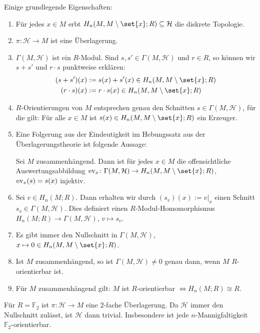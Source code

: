 \begin{bemerkung}[{name=[{Eigenschaften der Vereinigung der Homologieklassen}]},label=bem:1612]
	Einige grundlegende Eigenschaften:
	\begin{enumerate}[1),itemsep=1pt]
		\item Für jedes $x \in M$ erbt $H_n(M,M \setminus \set{x};R) \subseteq \mathcal{H}$ die diskrete Topologie.
		\item $\pi \colon \mathcal{H} \to M$ ist eine Überlagerung.
		\item $\Gamma(M,\mathcal{H})$ ist ein $R$-Modul. Sind $s,s' \in \Gamma(M,\mathcal{H})$ und $r \in R$, so können wir $s+s'$ und $r \cdot s$ punktweise erklären:
		\begin{align*}
			(s+s') (x) &:= s(x) + s'(x) \in H_n(M,M \setminus \set{x};R )\\
			(r \cdot s) (x) &:= r \cdot s(x) \in H_n(M,M \setminus \set{x};R )
		\end{align*}
		\item $R$-Orientierungen von $M$ entsprechen genau den Schnitten $s \in \Gamma(M,\mathcal{H})$, für die gilt: Für alle $x \in M$ ist 
		$s(x) \in H_n(M,M \setminus \set{x};R)$ ein Erzeuger.
		\item Eine Folgerung aus der Eindeutigkeit im Hebungssatz aus der Überlagerungstheorie ist folgende Aussage:
	
		Sei $M$ zusammenhängend. Dann ist für jedes $x \in M$ die offensichtliche Auswertungsabbildung $\ev_x\colon \Gamma(M,\mathcal{H}) \to H_n(M,M \setminus \set{x};R)$, $\operatorname{ev}_x(s)=s(x)$ injektiv.
		\item Sei $v \in H_n(M;R)$. Dann erhalten wir durch $(s_v)(x) := v|_x$ einen Schnitt $s_v\in \Gamma(M,\mathcal{H})$. Dies definiert einen $R$-Modul-Homomorphismus
		$H_n(M;R) \to \Gamma(M,\mathcal{H})$, $v \mapsto s_v$.
		\item Es gibt immer den Nullschnitt in $\Gamma(M,\mathcal{H})$, $x \mapsto 0\in H_n(M,M\setminus \set{x};R)$.
		\item Ist $M$ zusammenhängend, so ist $\Gamma(M,\mathcal{H})\not=0$ genau dann, wenn $M$ $R$-orientierbar ist.
		\item Für $M$ zusammenhängend gilt: $M$ ist $R$-orientierbar $\iff H_n(M;R) \cong R$. 
	\end{enumerate}
\end{bemerkung}

\begin{beispiel}[{name=[Für den Restklassenkörper $\mod 2$ erhält man eine 2-fache Überlagerung]}]
	Für $R=\mathbb{F}_2$ ist $\pi\colon \mathcal{H} \to M$ eine $2$-fache Überlagerung. 
	Da $\mathcal{H}$ immer den Nullschnitt zulässt, ist $\mathcal{H}$ dann trivial. 
	Insbesondere ist jede $n$-Mannigfaltigkeit $\mathbb{F}_2$-orientierbar.
\end{beispiel}

